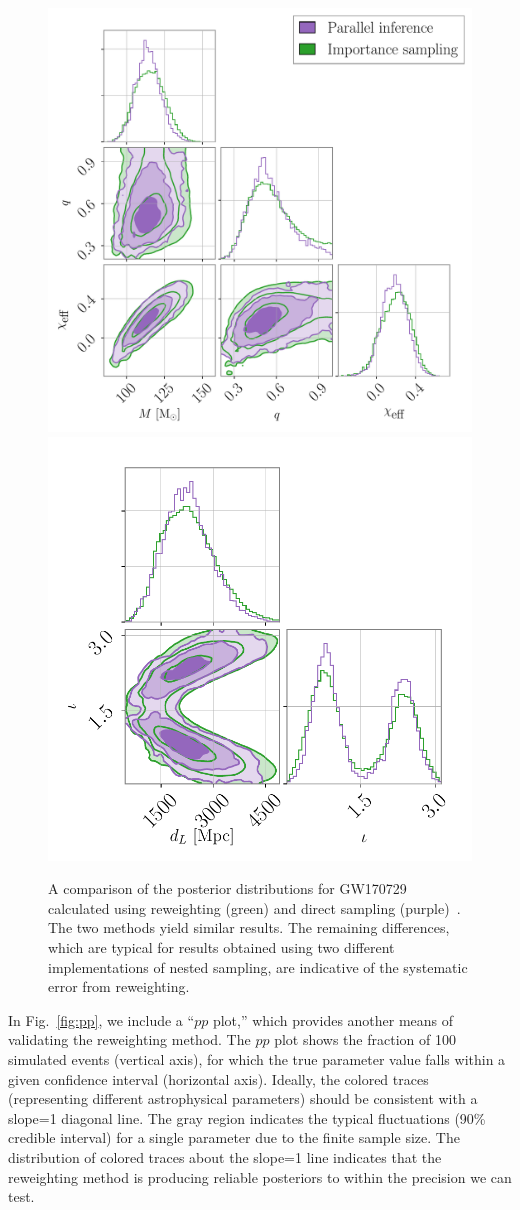 \documentclass[prd,superscriptaddress,twocolumn,nopreprintnumbers,floatfix,longbibliography]{revtex4}
\begin{document}
\begin{appendix}
\begin{figure}[t!]
    \centering
    \includegraphics[width=0.56\linewidth]{GW170729_comparison_intrinsic.pdf}
    \includegraphics[width=0.405\linewidth]{GW170729_comparison_extrinsic.pdf}
    \caption{A comparison of the posterior distributions for GW170729 calculated using reweighting (green) and direct sampling (purple)~\cite{smith}.
    The two methods yield similar results.
    The remaining differences, which are typical for results obtained using two different implementations of nested sampling, are indicative of the systematic error from reweighting.}
    \label{fig:GW170729_compare}
\end{figure}

In Fig.~\ref{fig:pp}, we include a ``$pp$ plot,'' which provides another means of validating the reweighting method.
The $pp$ plot shows the fraction of 100 simulated events (vertical axis), for which the true parameter value falls within a given confidence interval (horizontal axis).
Ideally, the colored traces (representing different astrophysical parameters) should be consistent with a slope=1 diagonal line.
The gray region indicates the typical fluctuations (90\% credible interval) for a single parameter due to the finite sample size.
The distribution of colored traces about the slope=1 line indicates that the reweighting method is producing reliable posteriors to within the precision we can test. 


\end{appendix}
\end{document}
